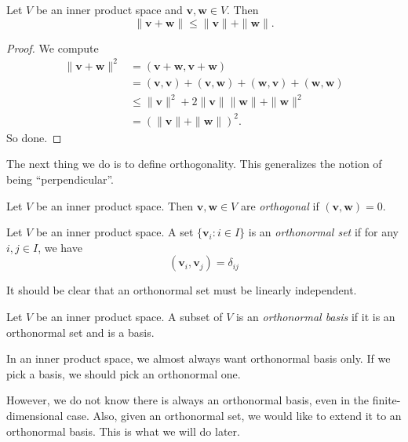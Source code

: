 \documentclass[a4paper]{article}
\begin{document}
\begin{cor}
  Let $V$ be an inner product space and $\mathbf{v}, \mathbf{w} \in V$. Then
  \[
    \|\mathbf{v} + \mathbf{w}\| \leq \|\mathbf{v}\| + \|\mathbf{w}\|.
  \]
\end{cor}

\begin{proof}
  We compute
  \begin{align*}
    \|\mathbf{v} + \mathbf{w}\|^2 &= (\mathbf{v} + \mathbf{w}, \mathbf{v} + \mathbf{w}) \\
    &= (\mathbf{v}, \mathbf{v}) + (\mathbf{v}, \mathbf{w}) + (\mathbf{w}, \mathbf{v}) + (\mathbf{w}, \mathbf{w})\\
    &\leq \|\mathbf{v}\|^2 + 2 \|\mathbf{v} \| \|\mathbf{w}\| + \|\mathbf{w}\|^2\\
    &= (\|\mathbf{v}\| + \|\mathbf{w}\|)^2.
  \end{align*}
  So done.
\end{proof}

The next thing we do is to define orthogonality. This generalizes the notion of being ``perpendicular''.

\begin{defi}
  Let $V$ be an inner product space. Then $\mathbf{v}, \mathbf{w} \in V$ are \emph{orthogonal} if $(\mathbf{v}, \mathbf{w}) = 0$.
\end{defi}

\begin{defi}
  Let $V$ be an inner product space. A set $\{\mathbf{v}_i: i \in I\}$ is an \emph{orthonormal set} if for any $i, j \in I$, we have
  \[
    (\mathbf{v}_i, \mathbf{v}_j) = \delta_{ij}
  \]
\end{defi}
It should be clear that an orthonormal set must be linearly independent.

\begin{defi}
  Let $V$ be an inner product space. A subset of $V$ is an \emph{orthonormal basis} if it is an orthonormal set and is a basis.
\end{defi}

In an inner product space, we almost always want orthonormal basis only. If we pick a basis, we should pick an orthonormal one.

However, we do not know there is always an orthonormal basis, even in the finite-dimensional case. Also, given an orthonormal set, we would like to extend it to an orthonormal basis. This is what we will do later.
\end{document}
